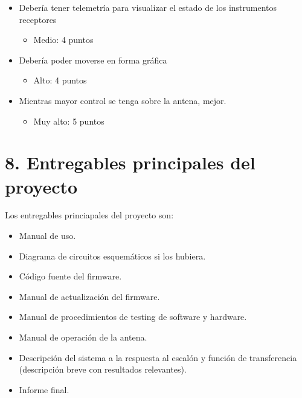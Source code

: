 \documentclass[11pt, %
codirector, %
]{charter}
\begin{document}
\begin{itemize}
	\item Debería tener telemetría para visualizar el estado de los instrumentos receptores
		\begin{itemize}
			\item Medio: 4 puntos
		\end{itemize}

	\item Debería poder moverse en forma gráfica 
		\begin{itemize}
			\item Alto: 4 puntos
		\end{itemize}
	
	\item Mientras mayor control se tenga sobre la antena, mejor. 
		\begin{itemize}
			\item Muy alto: 5 puntos
		\end{itemize}
		

\end{itemize}

% 



\section{8. Entregables principales del proyecto}
\label{sec:entregables}



Los entregables princiapales del proyecto son:

\begin{itemize}
	\item Manual de uso. 
	\item Diagrama de circuitos esquemáticos si los hubiera. 
	\item Código fuente del firmware. 
	\item Manual de actualización del firmware.  
	\item Manual de procedimientos de testing de software y hardware.
	\item Manual de operación de la antena. 
	\item Descripción del sistema a la respuesta al escalón y función de transferencia (descripción breve con resultados relevantes).
	\item Informe final.
\end{itemize}
\end{document}

